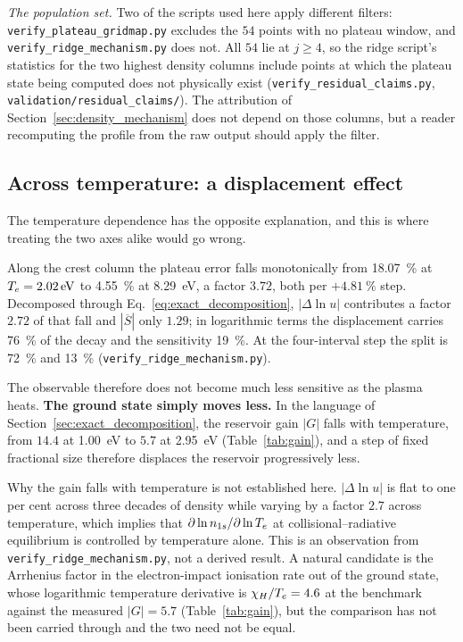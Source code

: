 \emph{The population set.} Two of the scripts used here apply different filters:
\texttt{verify\_plateau\_gridmap.py} excludes the $54$ points with no plateau
window, and \texttt{verify\_ridge\_mechanism.py} does not. All $54$ lie at
$j\ge4$, so the ridge script's statistics for the two highest density columns
include points at which the plateau state being computed does not physically
exist (\texttt{verify\_residual\_claims.py}, \texttt{validation/residual\_claims/}). The attribution of
Section~\ref{sec:density_mechanism} does not depend on those columns, but a
reader recomputing the profile from the raw output should apply the filter.

\subsection{Across temperature: a displacement effect}
\label{sec:temperature_mechanism}

The temperature dependence has the opposite explanation, and this is where
treating the two axes alike would go wrong.

Along the crest column the plateau error falls monotonically from
\SI{18.07}{\percent} at $T_e = \SI{2.02}{\electronvolt}$ to \SI{4.55}{\percent}
at \SI{8.29}{\electronvolt}, a factor $3.72$, both per $+\SI{4.81}{\percent}$
step. Decomposed through Eq.~\eqref{eq:exact_decomposition}, $|\Delta\ln u|$
contributes a factor $2.72$ of that fall and $|\overline{S}|$ only $1.29$; in
logarithmic terms the displacement carries \SI{76}{\percent} of the decay and
the sensitivity \SI{19}{\percent}. At the four-interval step the split is
\SI{72}{\percent} and \SI{13}{\percent}
(\texttt{verify\_ridge\_mechanism.py}).

The observable therefore does not become much less sensitive as the plasma
heats. \textbf{The ground state simply moves less.} In the language of
Section~\ref{sec:exact_decomposition}, the reservoir gain $|G|$ falls with
temperature, from $14.4$ at \SI{1.00}{\electronvolt} to $5.7$ at
\SI{2.95}{\electronvolt} (Table~\ref{tab:gain}), and a step of fixed fractional
size therefore displaces the reservoir progressively less.

Why the gain falls with temperature is not established here. $|\Delta\ln u|$
is flat to one per cent across three decades of density while varying by a
factor $2.7$ across temperature, which implies that
$\partial\ln n_{1s}/\partial\ln T_e$ at collisional--radiative equilibrium is
controlled by temperature alone. This is an observation from
\texttt{verify\_ridge\_mechanism.py}, not a derived result. A natural
candidate is the Arrhenius factor in the electron-impact ionisation rate out
of the ground state, whose logarithmic temperature derivative is
$\chi_H/T_e = 4.6$ at the benchmark against the measured $|G| = 5.7$
(Table~\ref{tab:gain}), but the comparison has not been carried through and
the two need not be equal.

